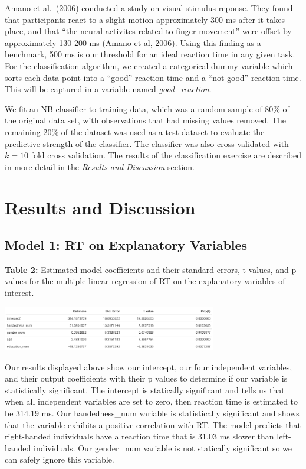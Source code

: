 \documentclass[
]{article}
\begin{document}
Amano et al.~(2006) conducted a study on visual stimulus reponse. They
found that participants react to a slight motion approximately 300 ms
after it takes place, and that ``the neural activites related to finger
movement'' were offset by approximately 130-200 ms (Amano et al, 2006).
Using this finding as a benchmark, 500 ms is our threshold for an ideal
reaction time in any given task. For the classification algorithm, we
created a categorical dummy variable which sorts each data point into a
``good'' reaction time and a ``not good'' reaction time. This will be
captured in a variable named \emph{good\_reaction}.

We fit an NB classifier to training data, which was a random sample of
80\% of the original data set, with observations that had missing values
removed. The remaining 20\% of the dataset was used as a test dataset to
evaluate the predictive strength of the classifier. The classifier was
also cross-validated with \(k = 10\) fold cross validation. The results
of the classification exercise are described in more detail in the
\emph{Results and Discussion} section.

\hypertarget{results-and-discussion}{%
\section{Results and Discussion}\label{results-and-discussion}}

\hypertarget{model-1-rt-on-explanatory-variables}{%
\subsection{Model 1: RT on Explanatory
Variables}\label{model-1-rt-on-explanatory-variables}}

\textbf{Table 2:} Estimated model coefficients and their standard
errors, t-values, and p-values for the multiple linear regression of RT
on the explanatory variables of interest.

\begin{center}\includegraphics[width=3.69in]{Results_Model_1} \end{center}

Our results displayed above show our intercept, our four independent
variables, and their output coefficients with their p values to
determine if our variable is statistically significant. The intercept is
statically significant and tells us that when all independent variables
are set to zero, then reaction time is estimated to be 314.19 ms. Our
handedness\_num variable is statistically significant and shows that the
variable exhibits a positive correlation with RT. The model predicts
that right-handed individuals have a reaction time that is 31.03 ms
slower than left-handed individuals. Our gender\_num variable is not
statically significant so we can safely ignore this variable.
\end{document}
